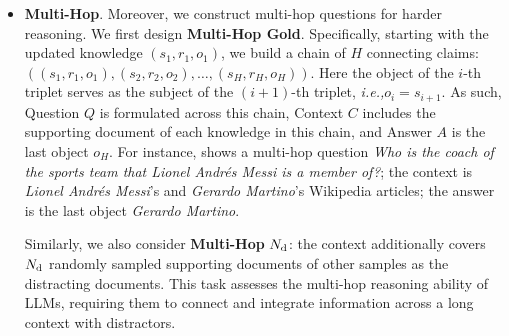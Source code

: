 \documentclass[11pt]{article}
\newcommand{\mscript}[1]{\text{\scriptsize{#1}}}
\newcommand{\ie}{\emph{i.e.,}\xspace}
\begin{document}
\begin{itemize}[leftmargin=*, itemsep=2pt]
                \item
                    \textbf{Multi-Hop}.
                    Moreover, we construct multi-hop questions for harder reasoning.
                    We first design \textbf{Multi-Hop Gold}.
                    Specifically, starting with the updated knowledge $(s_{1}, r_{1}, o_{1})$,
                    we build a chain of $H$ connecting claims:
                    $((s_{1}, r_{1}, o_{1}), (s_{2}, r_{2}, o_{2}), \dots, (s_{H}, r_{H}, o_{H}))$.
                    Here the object of the $i$-th triplet serves as the subject of the $(i\!+\!1)$-th triplet, \ie $o_{i} = s_{i+1}$.
                    As such, Question $Q$ is formulated across this chain,
                    Context $C$ includes the supporting document of each knowledge in this chain,
                    and Answer $A$ is the last object $o_{H}$.
                    For instance,  shows a multi-hop question \textit{Who is the coach of the sports team that Lionel Andrés Messi is a member of?};
                    the context is \textit{Lionel Andrés Messi}'s and \textit{Gerardo Martino}'s Wikipedia articles;
                    the answer is the last object \textit{Gerardo Martino}.

                    Similarly, we also consider \textbf{Multi-Hop} $N_{\mscript{d}}$:
                    the context additionally covers $N_{\mscript{d}}$ randomly sampled supporting documents of other samples as the distracting documents.
                    This task assesses the multi-hop reasoning ability of LLMs, requiring them to connect and integrate information across a long context with distractors.
        \end{itemize}
\end{document}
